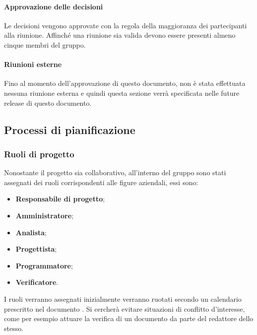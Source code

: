                         \paragraph{Approvazione delle decisioni}
                            Le decisioni vengono approvate con la regola della maggioranza dei partecipanti alla riunione.
                            Affinché una riunione sia valida devono essere presenti almeno cinque membri del gruppo.
                            
                      \paragraph{Riunioni esterne}
                      Fino al momento dell'approvazione di questo documento, non è stata effettuata nessuna riunione esterna e quindi questa sezione verrà specificata nelle future release di questo documento.
        \subsection{Processi di pianificazione}
            \subsubsection{Ruoli di progetto}
                Nonostante il progetto sia collaborativo, all'interno del gruppo sono stati assegnati dei ruoli corrispondenti alle figure aziendali, essi sono:
                \begin{itemize}
                    \item \textbf{Responsabile di progetto};
                    \item \textbf{Amministratore};
                    \item \textbf{Analista};
                    \item \textbf{Progettista};
                    \item \textbf{Programmatore};
                    \item \textbf{Verificatore}.
                \end{itemize}
                I ruoli verranno assegnati inizialmente verranno ruotati secondo un calendario prescritto nel documento \PdP.
                Si cercherà evitare situazioni di conflitto d'interesse, come per esempio attuare la verifica di un documento da parte del redattore dello stesso.

